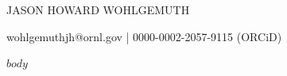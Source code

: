 \documentclass[10pt]{article}
\begin{document}
\begin{center}\Huge {JASON HOWARD WOHLGEMUTH}\end{center}
\begin{center}wohlgemuthjh@ornl.gov | 0000-0002-2057-9115 (ORCiD)\end{center}

$body$

\end{document}
